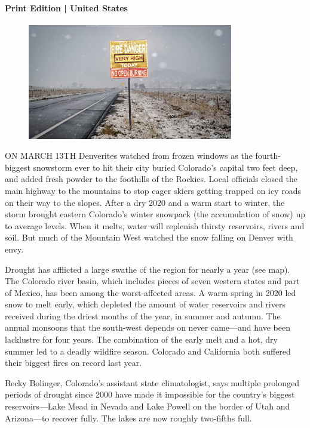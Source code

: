 \documentclass{article}
\begin{document}
\paragraph{Print Edition | United States  \quad \color{gray}{Mar 25th 2021 }}
\begin{figure}[h]
\centering
\includegraphics[width=0.8\textwidth]{images/20210327_usp002.jpg}
\end{figure}
\lettrine{O}N MARCH 13TH Denverites watched from frozen windows as the fourth-biggest snowstorm ever to hit their city buried Colorado's capital two feet deep, and added fresh powder to the foothills of the Rockies. Local officials closed the main highway to the mountains to stop eager skiers getting trapped on icy roads on their way to the slopes. After a dry 2020 and a warm start to winter, the storm brought eastern Colorado's winter snowpack (the accumulation of snow) up to average levels. When it melts, water will replenish thirsty reservoirs, rivers and soil. But much of the Mountain West watched the snow falling on Denver with envy. 

Drought has afflicted a large swathe of the region for nearly a year (see map). The Colorado river basin, which includes pieces of seven western states and part of Mexico, has been among the worst-affected areas. A warm spring in 2020 led snow to melt early, which depleted the amount of water reservoirs and rivers received during the driest months of the year, in summer and autumn. The annual monsoons that the south-west depends on never came---and have been lacklustre for four years. The combination of the early melt and a hot, dry summer led to a deadly wildfire season. Colorado and California both suffered their biggest fires on record last year. 

Becky Bolinger, Colorado's assistant state climatologist, says multiple prolonged periods of drought since 2000 have made it impossible for the country's biggest reservoirs---Lake Mead in Nevada and Lake Powell on the border of Utah and Arizona---to recover fully. The lakes are now roughly two-fifths full. 
\end{document}
